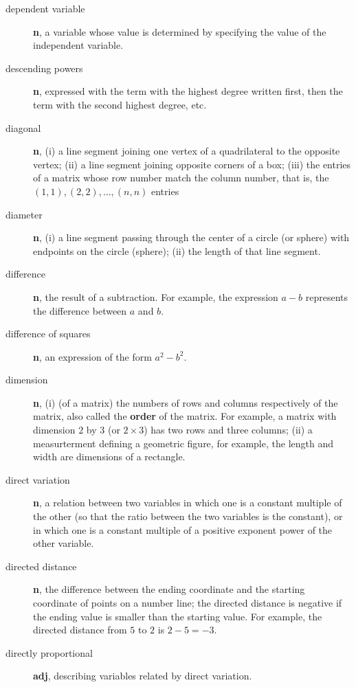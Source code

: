 \documentclass[10pt,]{book}
\newcommand{\terminology}[1]{\textbf{#1}}
\theoremstyle{plain}
\theoremstyle{definition}
\theoremstyle{definition}
\theoremstyle{definition}
\numberwithin{equation}{part}
\begin{document}
\begin{description}
\item[{dependent variable}]\hypertarget{li-546}{}\terminology{n}, a variable whose value is determined by specifying the value of the independent variable.%
\item[{descending powers}]\hypertarget{li-547}{}\terminology{n}, expressed with the term with the highest degree written first, then the term with the second highest degree, etc.%
\item[{diagonal}]\hypertarget{li-548}{}\terminology{n}, (i) a line segment joining one vertex of a quadrilateral to the opposite vertex; (ii) a line segment joining opposite corners of a box; (iii) the entries of a matrix whose row number match the column number, that is, the \((1, 1), (2, 2), \ldots , (n, n)\) entries%
\item[{diameter}]\hypertarget{li-549}{}\terminology{n}, (i) a line segment passing through the center of a circle (or sphere) with endpoints on the circle (sphere); (ii) the length of that line segment.%
\item[{difference}]\hypertarget{li-550}{}\terminology{n}, the result of a subtraction. For example, the expression \(a − b\) represents the difference between \(a\) and \(b\).%
\item[{difference of squares}]\hypertarget{li-551}{}\terminology{n}, an expression of the form \(a^2 − b^2\).%
\item[{dimension}]\hypertarget{li-552}{}\terminology{n}, (i) (of a matrix) the numbers of rows and columns respectively of the matrix, also called the \terminology{order} of the matrix. For example, a matrix with dimension \(2\) by \(3\) (or \(2\times 3\)) has two rows and three columns; (ii) a measurterment defining a geometric figure, for example, the length and width are dimensions of a rectangle.%
\item[{direct variation}]\hypertarget{li-553}{}\terminology{n}, a relation between two variables in which one is a constant multiple of the other (so that the ratio between the two variables is the constant), or in which one is a constant multiple of a positive exponent power of the other variable.%
\item[{directed distance}]\hypertarget{li-554}{}\terminology{n}, the difference between the ending coordinate and the starting coordinate of points on a number line; the directed distance is negative if the ending value is smaller than the starting value. For example, the directed distance from \(5\) to \(2\) is \(2 − 5 = −3\).%
\item[{directly proportional}]\hypertarget{li-555}{}\terminology{adj}, describing variables related by direct variation.%

\end{description}
\end{document}
